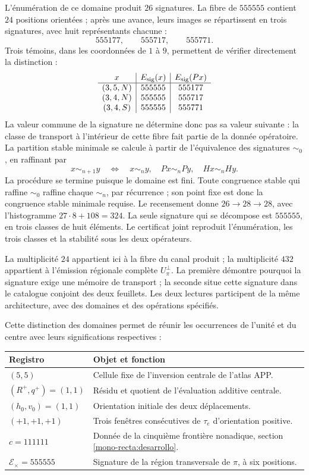 L'énumération de ce domaine produit \(26\) signatures. La fibre de
\(555555\) contient \(24\) positions orientées ; après une
avance, leurs images se répartissent en trois signatures, avec huit
représentants chacune :
\[
 555177,\qquad555717,\qquad555771.
\]
Trois témoins, dans les coordonnées de \(1\) à \(9\), permettent de vérifier
directement la distinction :
\[
\begin{array}{c|c|c}
x&E_{\rm sig}(x)&E_{\rm sig}(Px)\\\hline
(3,5,N)&555555&555177\\
(3,4,N)&555555&555717\\
(3,4,S)&555555&555771
\end{array}
\]
La valeur commune de la signature ne détermine donc pas sa valeur suivante :
la classe de transport à l'intérieur de cette fibre fait partie de la donnée
opératoire. La partition stable minimale se calcule à partir de
l'équivalence des signatures \(\sim_0\), en raffinant par
\[
 x\sim_{n+1}y\quad\Longleftrightarrow\quad
 x\sim_n y,\quad Px\sim_n Py,\quad Hx\sim_n Hy.
\]
La procédure se termine puisque le domaine est fini. Toute congruence stable qui raffine \(\sim_0\) raffine chaque \(\sim_n\), par récurrence ; son point fixe est donc la congruence stable minimale requise. Le recensement donne \(26\to28\to28\), avec l'histogramme \(27\cdot8+108=324\). La seule signature qui se décompose est \(555555\), en trois classes de huit éléments. Le certificat joint reproduit l'énumération, les trois classes et la stabilité sous les deux opérateurs.

La multiplicité \(24\) appartient ici à la fibre du canal produit ;
la multiplicité \(432\) appartient à l'émission régionale complète
\(U_\pi^\perp\). La première démontre pourquoi la signature exige une mémoire
de transport ; la seconde situe cette signature dans le catalogue conjoint
des deux feuillets. Les deux lectures participent de la même architecture,
avec des domaines et des opérations spécifiés.

Cette distinction des domaines permet de réunir les occurrences de l'unité
et du centre avec leurs significations respectives :
\begin{center}
\small
\begin{tabularx}{\textwidth}{@{}lX@{}}
\toprule
Registro & Objet et fonction \\
\midrule
\((5,5)\) & Cellule fixe de l'inversion centrale de l'atlas APP.\\
\((R^+,q^+)=(1,1)\) & Résidu et quotient de l'évaluation additive centrale.\\
\((h_0,v_0)=(1,1)\) & Orientation initiale des deux déplacements.\\
\((+1,+1,+1)\) & Trois fenêtres consécutives de \(\tau_e\) d'orientation positive.\\
\(c=111111\) & Donnée de la cinquième frontière nonadique, section \ref{mono-recta:desarrollo}.\\
\(\mathcal E_\times=555555\) & Signature de la région transversale de \(\pi\), à six positions.\\
\bottomrule
\end{tabularx}
\end{center}

